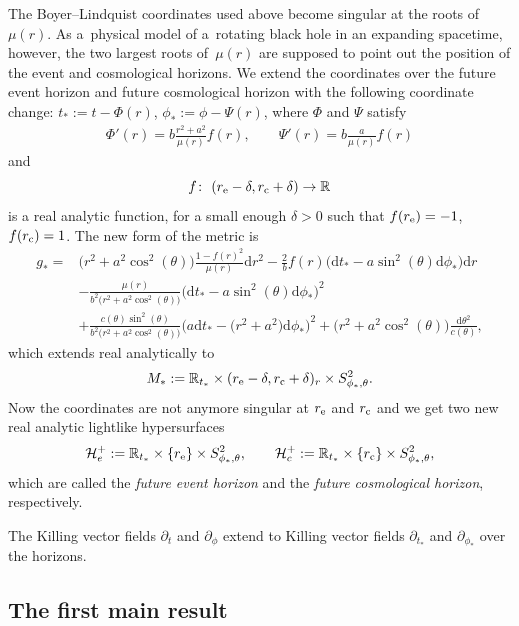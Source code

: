 \documentclass[pdftex]{sigma}
\newcommand{\de}{\delta}
\renewcommand{\d}{\partial}
\newcommand{\Ho}{\mathcal H}
\newcommand{\md}{\mathrm d}
\newcommand{\R}[0]{\mathbb{R}}
\numberwithin{equation}{section}
\begin{document}
The Boyer--Lindquist coordinates used above become singular at the roots of $\mu(r)$.
As a~physical model of a~rotating black hole in an expanding spacetime, however, the two largest roots of~$\mu(r)$ are supposed to point out the position of the event and cosmological horizons.
We extend the coordinates over the future event horizon and future cosmological horizon with the following coordinate change: $t_*:= t - \Phi(r)$, $\phi_*:= \phi - \Psi(r)$,
where $\Phi$ and $\Psi$ satisfy
\begin{align*}
		\Phi'(r)
			= b \frac{r^2 + a^2}{\mu(r)} f(r), \qquad
		\Psi'(r)
			= b \frac a{\mu(r)} f(r)
\end{align*}
and
\[
	f\colon\ (r_{\rm e} - \de, r_{\rm c} + \de) \to \R
\]
is a real analytic function, for a small enough $\de > 0$ such that $f(r_{\rm e})
		= -1$, $f(r_{\rm c}) = 1$.
The new form of the metric is
\begin{align*}%
	g_*
		={}& \big(r^2 + a^2 \cos^2(\theta)\big)\frac{1 - f(r)^2}{\mu(r)} \md r^2 - \frac 2 b f(r) \big(\md t_* - a \sin^2(\theta) \md \phi_*\big)\md r \\
		& - \frac{\mu(r)}{b^2\big(r^2 + a^2 \cos^2(\theta)\big)}\big(\md t_* - a \sin^2(\theta) \md \phi_* \big)^2 \\
		& + \frac{c(\theta)\sin^2(\theta)}{b^2\big(r^2 + a^2 \cos^2(\theta)\big)}\big(a\md t_* - \big(r^2 + a^2\big) \md \phi_*\big)^2 + \big(r^2 + a^2 \cos^2(\theta)\big)\frac{\md \theta^2}{c(\theta)},
\end{align*}
which extends real analytically to
\[
	M_*
		:= \R_{t_*} \times (r_{\rm e} - \de, r_{\rm c} + \de)_r \times S^2_{\phi_*, \theta}.
\]
Now the coordinates are not anymore singular at $r_{\rm e}$ and $r_{\rm c}$ and we get two new real analytic lightlike hypersurfaces
\begin{align*}
	\Ho_e^+
		:= \R_{t_*} \times \{r_{\rm e}\} \times S^2_{\phi_*, \theta}, \qquad
	\Ho_c^+
		:= \R_{t_*} \times \{r_{\rm c}\} \times S^2_{\phi_*, \theta},
\end{align*}
which are called the \emph{future event horizon} and the \emph{future cosmological horizon}, respectively.

\begin{Remark}
The Killing vector fields $\d_t$ and $\d_\phi$ extend to Killing vector fields $\d_{t_*}$ and $\d_{\phi_*}$ over the horizons.
\end{Remark}

\subsection{The first main result}
\end{document}

